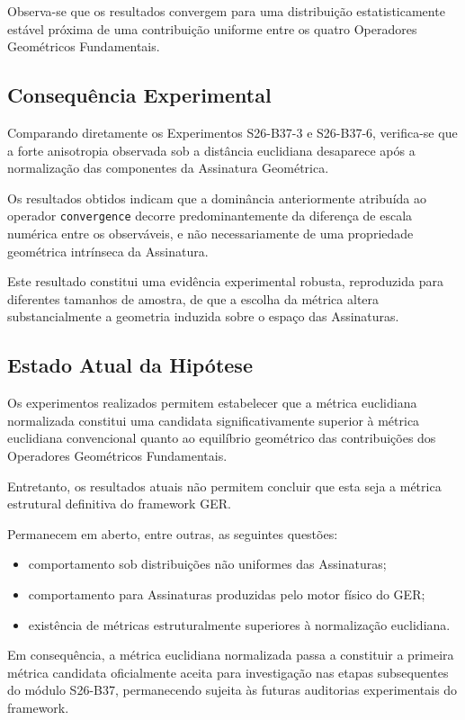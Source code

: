 \documentclass[11pt,a4paper]{article}
\begin{document}
Observa-se que os resultados convergem para uma distribuição
estatisticamente estável próxima de uma contribuição uniforme entre os
quatro Operadores Geométricos Fundamentais.

\subsection{Consequência Experimental}

Comparando diretamente os Experimentos S26-B37-3 e S26-B37-6, verifica-se
que a forte anisotropia observada sob a distância euclidiana desaparece
após a normalização das componentes da Assinatura Geométrica.

Os resultados obtidos indicam que a dominância anteriormente atribuída ao
operador \texttt{convergence} decorre predominantemente da diferença de
escala numérica entre os observáveis, e não necessariamente de uma
propriedade geométrica intrínseca da Assinatura.

Este resultado constitui uma evidência experimental robusta, reproduzida
para diferentes tamanhos de amostra, de que a escolha da métrica altera
substancialmente a geometria induzida sobre o espaço das Assinaturas.

\subsection{Estado Atual da Hipótese}

Os experimentos realizados permitem estabelecer que a métrica euclidiana
normalizada constitui uma candidata significativamente superior à métrica
euclidiana convencional quanto ao equilíbrio geométrico das contribuições
dos Operadores Geométricos Fundamentais.

Entretanto, os resultados atuais não permitem concluir que esta seja a
métrica estrutural definitiva do framework GER.

Permanecem em aberto, entre outras, as seguintes questões:

\begin{itemize}
\item comportamento sob distribuições não uniformes das Assinaturas;
\item comportamento para Assinaturas produzidas pelo motor físico do GER;
\item existência de métricas estruturalmente superiores à normalização
euclidiana.
\end{itemize}

Em consequência, a métrica euclidiana normalizada passa a constituir a
primeira métrica candidata oficialmente aceita para investigação nas
etapas subsequentes do módulo S26-B37, permanecendo sujeita às futuras
auditorias experimentais do framework.
\end{document}
